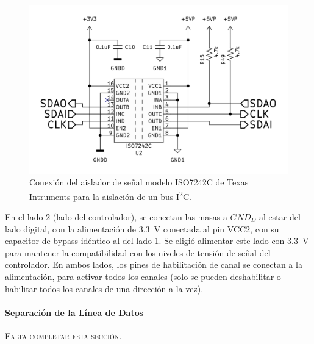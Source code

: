 \begin{figure}[h]
    \centering
    \includegraphics[scale=1.1]{Imagenes/Conexion ISO7242C.png}
    \caption{Conexión del aislador de señal modelo ISO7242C de Texas Intruments para la aislación de un bus I\textsuperscript{2}C.}
    \label{conexion_ISO7242C}
\end{figure}

En el lado 2 (lado del controlador), se conectan las masas a $GND_D$ al estar del lado digital, con la alimentación de \SI[]{3.3}[]{\volt} conectada al pin VCC2, con su capacitor de bypass idéntico al del lado 1. Se eligió alimentar este lado con \SI[]{3.3}[]{\volt} para mantener la compatibilidad con los niveles de tensión de señal del controlador. En ambos lados, los pines de habilitación de canal se conectan a la alimentación, para activar todos los canales (solo se pueden deshabilitar o habilitar todos los canales de una dirección a la vez).\\

\paragraph{Separación de la Línea de Datos}

{\Bold\scshape Falta completar esta sección.}\\

\lipsum[1]\\